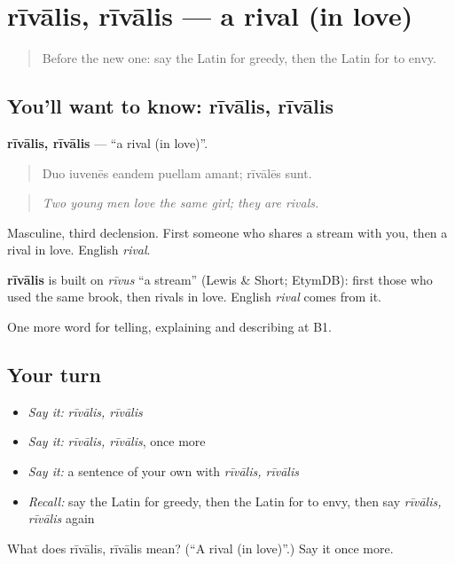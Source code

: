 \section[rīvālis, rīvālis]{rīvālis, rīvālis — a rival (in love)}

\label{lesson:LA-C500-rivalis}



\begin{quote}
Before the new one: say the Latin for greedy, then the Latin for to envy.
\end{quote}

\subsection*{You'll want to know: rīvālis, rīvālis}
\textbf{rīvālis, rīvālis} — \textquotedblleft{}a rival (in love)\textquotedblright{}.

\begin{quote}
Duo iuvenēs eandem puellam amant; rīvālēs sunt.
\end{quote}

\begin{quote}
\emph{Two young men love the same girl; they are rivals.}
\end{quote}

Masculine, third declension. First someone who shares a stream with you, then a rival in love. English \emph{rival}.

\begin{cousinweb}
\textbf{rīvālis} is built on \emph{rīvus} \textquotedblleft{}a stream\textquotedblright{} (Lewis \& Short; EtymDB): first those who used the same brook, then rivals in love. English \emph{rival} comes from it.
\end{cousinweb}

\begin{grammarlens}[title={What you've built}]
One more word for telling, explaining and describing at B1.
\end{grammarlens}

\subsection*{Your turn}
\begin{itemize}
\raggedright
  \item \emph{Say it:} \emph{rīvālis, rīvālis}
  \item \emph{Say it:} \emph{rīvālis, rīvālis}, once more
  \item \emph{Say it:} a sentence of your own with \emph{rīvālis, rīvālis}
  \item \emph{Recall:} say the Latin for greedy, then the Latin for to envy, then say \emph{rīvālis, rīvālis} again
\end{itemize}

\begin{tcolorbox}[breakable,colback=teal!4,colframe=teal!35!black,title={Before you move on}]
What does rīvālis, rīvālis mean? (\textquotedblleft{}A rival (in love)\textquotedblright{}.) Say it once more.
\end{tcolorbox}

